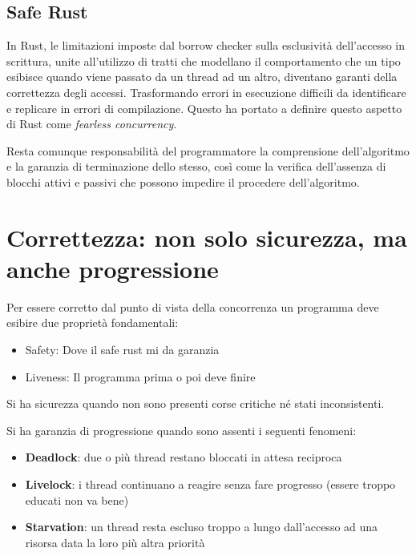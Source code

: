 \subsection{Safe Rust}
In Rust, le limitazioni imposte dal borrow checker sulla esclusività
dell'accesso in scrittura, unite all'utilizzo di tratti che modellano il
comportamento che un tipo esibisce quando viene passato da un thread ad un altro,
diventano garanti della correttezza degli accessi.
Trasformando errori in esecuzione difficili da identificare e replicare in
errori di compilazione.
Questo ha portato a definire questo aspetto di Rust come \textit{fearless concurrency}.



Resta comunque responsabilità del programmatore la comprensione dell'algoritmo e
la garanzia di terminazione dello stesso, così come la verifica dell'assenza di
blocchi attivi e passivi che possono impedire il procedere dell'algoritmo.



\section{Correttezza: non solo sicurezza, ma anche progressione}

Per essere corretto dal punto di vista della concorrenza un programma deve
esibire due proprietà fondamentali:

\begin{itemize}
  \item Safety: Dove il safe rust mi da garanzia
  \item Liveness: Il programma prima o poi deve finire
\end{itemize}

Si ha sicurezza quando non sono presenti corse critiche né stati inconsistenti.

Si ha garanzia di progressione quando sono assenti i seguenti fenomeni:

\begin{itemize}
  \item \textbf{Deadlock}: due o più thread restano bloccati in attesa reciproca
  \item \textbf{Livelock}: i thread continuano a reagire senza fare progresso (essere troppo educati non va bene)
  \item \textbf{Starvation}: un thread resta escluso troppo a lungo dall'accesso ad una risorsa data la loro più altra priorità
\end{itemize}


